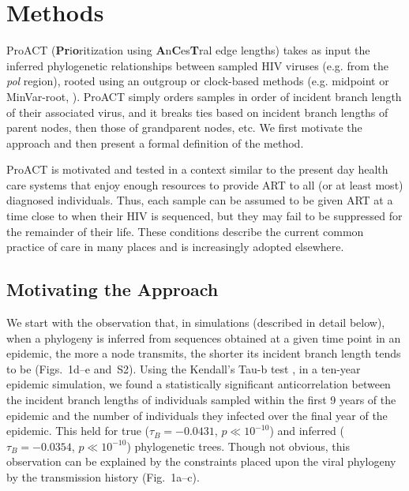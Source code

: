 \documentclass[a4paper,10pt]{article}
\newcommand{\PLWH}{sample\xspace}
\begin{document}
\section{Methods}
ProACT (\textbf{Pr}i\textbf{o}ritization using \textbf{A}n\textbf{C}es\textbf{T}ral edge lengths) takes as input the inferred phylogenetic relationships between sampled HIV viruses (e.g. from the \textit{pol} region), rooted using an outgroup or clock-based methods (e.g. midpoint or MinVar-root, \textcite{Mai2017}). 
ProACT simply orders \PLWH{s} in order of incident branch length of their associated virus, and it breaks ties based on incident branch lengths of parent nodes, then those of grandparent nodes, etc.
We first motivate the approach and then present a formal definition of the method.

ProACT is motivated and tested in a context similar to the present day health care systems that enjoy enough resources to provide ART to all (or at least most) diagnosed individuals.
Thus, each \PLWH can be assumed to be given ART at a time close to when their HIV is sequenced, but they may fail to be suppressed for the remainder of their life.
These conditions describe the current common practice of care in many places and is increasingly adopted elsewhere. %


\subsection{Motivating the Approach}

We start with the observation that, in simulations (described in detail below),
when a phylogeny is inferred from sequences obtained at a given time point in an epidemic,
the more a node transmits, the shorter its incident branch length tends to be
(Figs.~1d--e and~S2).
Using the Kendall's Tau-b test \supercite{Kendall1938}, in a ten-year epidemic simulation, we found a statistically significant anticorrelation between the incident branch lengths of individuals sampled within the first 9 years of the epidemic and the number of individuals they infected over the final year of the epidemic. This held for true ($\tau_B=-0.0431$, $p\ll 10^{-10}$) and inferred ($\tau_B=-0.0354$, $p\ll 10^{-10}$) phylogenetic trees.
Though not obvious, this observation can be explained by the constraints placed upon the viral phylogeny by the transmission history (Fig.~1a--c).
\end{document}
